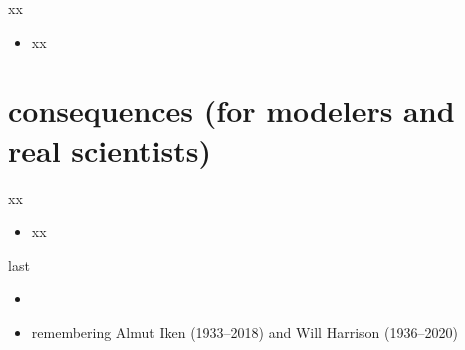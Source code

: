 \documentclass[10pt,hyperref,dvipsnames]{beamer}
\begin{document}
\begin{frame}{xx}
\begin{itemize}
\item xx
\end{itemize}
\end{frame}


\section{consequences (for modelers and real scientists)}

\begin{frame}{xx}
\begin{itemize}
\item xx
\end{itemize}
\end{frame}

\begin{frame}{last}
\begin{itemize}
\item 
\item remembering Almut Iken (1933--2018) and Will Harrison (1936--2020)
\end{itemize}
\end{frame}
\end{document}
